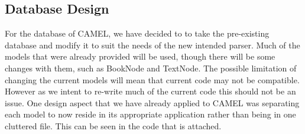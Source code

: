 \subsection*{Database Design}
	For the database of CAMEL, we have decided to to take the pre-existing database and modify it to suit the needs of the new intended parser. Much of the models that were already provided will be used, though there will be some changes with them, such as BookNode and TextNode. The possible limitation of changing the current models will mean that current code may not be compatible. However as we intent to re-write much of the current code this should not be an issue. One design aspect that we have already applied to CAMEL was separating each model to now reside in its appropriate application rather than being in one cluttered file. This can be seen in the code that is attached.\\ 
	

